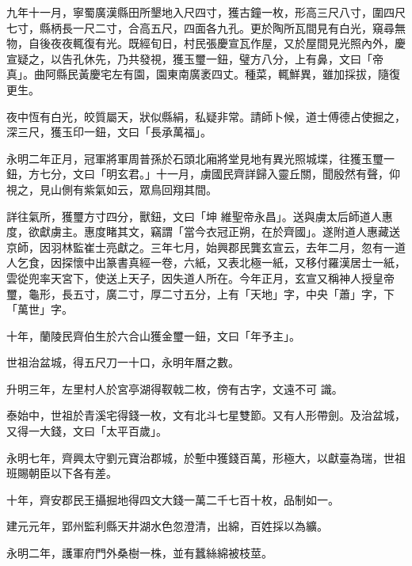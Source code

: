 \begin{pinyinscope}
 九年十一月，寧蜀廣漢縣田所墾地入尺四寸，獲古鐘一枚，形高三尺八寸，圍四尺七寸，縣柄長一尺二寸，合高五尺，四面各九孔。更於陶所瓦間見有白光，窺尋無物，自後夜夜輒復有光。既經旬日，村民張慶宣瓦作屋，又於屋間見光照內外，慶宣疑之，以告孔休先，乃共發視，獲玉璽一鈕，璧方八分，上有鼻，文曰「帝真」。曲阿縣民黃慶宅左有園，園東南廣袤四丈。種菜，輒鮮異，雖加採拔，隨復更生。



 夜中恆有白光，皎質屬天，狀似縣絹，私疑非常。請師卜候，道士傅德占使掘之，深三尺，獲玉印一鈕，文曰「長承萬福」。



 永明二年正月，冠軍將軍周普孫於石頭北廂將堂見地有異光照城堞，往獲玉璽一鈕，方七分，文曰「明玄君。」十一月，虜國民齊詳歸入靈丘關，聞殷然有聲，仰視之，見山側有紫氣如云，眾鳥回翔其間。



 詳往氣所，獲璽方寸四分，獸鈕，文曰「坤
 維聖帝永昌」。送與虜太后師道人惠度，欲獻虜主。惠度睹其文，竊謂「當今衣冠正朔，在於齊國」。遂附道人惠藏送京師，因羽林監崔士亮獻之。三年七月，始興郡民龔玄宣云，去年二月，忽有一道人乞食，因探懷中出篆書真經一卷，六紙，又表北極一紙，又移付羅漢居士一紙，雲從兜率天宮下，使送上天子，因失道人所在。今年正月，玄宣又稱神人授皇帝璽，龜形，長五寸，廣二寸，厚二寸五分，上有「天地」字，中央「蕭」字，下「萬世」字。



 十年，蘭陵民齊伯生於六合山獲金璽一鈕，文曰「年予主」。



 世祖治盆城，得五尺刀一十口，永明年曆之數。



 升明三年，左里村人於宮亭湖得靫戟二枚，傍有古字，文遠不可
 識。



 泰始中，世祖於青溪宅得錢一枚，文有北斗七星雙節。又有人形帶劍。及治盆城，又得一大錢，文曰「太平百歲」。



 永明七年，齊興太守劉元寶治郡城，於塹中獲錢百萬，形極大，以獻臺為瑞，世祖班賜朝臣以下各有差。



 十年，齊安郡民王攝掘地得四文大錢一萬二千七百十枚，品制如一。



 建元元年，郢州監利縣天井湖水色忽澄清，出綿，百姓採以為纊。



 永明二年，護軍府門外桑樹一株，並有蠶絲綿被枝莖。




\end{pinyinscope}
